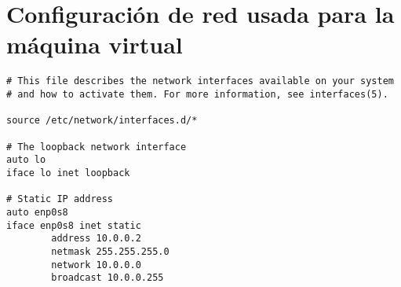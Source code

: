 

\renewcommand{\appendixname}{Apéndices}
\renewcommand{\appendixtocname}{Apéndices}
\renewcommand{\appendixpagename}{Apéndices}



\pagestyle{plain}

\appendix
\addappheadtotoc




\thispagestyle{plain} \section{Configuración de red usada para la máquina virtual}
\begin{lstlisting}[breaklines,frame=single]
# This file describes the network interfaces available on your system
# and how to activate them. For more information, see interfaces(5).

source /etc/network/interfaces.d/*

# The loopback network interface
auto lo
iface lo inet loopback

# Static IP address
auto enp0s8
iface enp0s8 inet static
        address 10.0.0.2  
        netmask 255.255.255.0
        network 10.0.0.0
        broadcast 10.0.0.255
\end{lstlisting}


\clearpage
\restoregeometry 